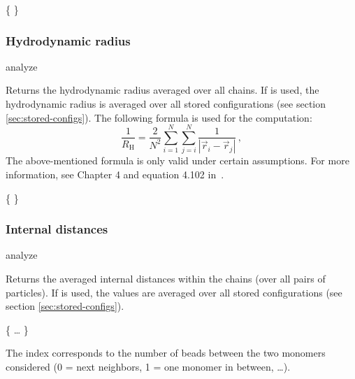 \begin{code}
\{     \}
\end{code}

\subsubsection{Hydrodynamic radius}
\begin{pysyntax}
\end{pysyntax}
\begin{essyntax}
  analyze  
\end{essyntax}
Returns the hydrodynamic radius averaged over all chains.  
If  is used, the hydrodynamic radius is averaged over all stored
configurations (see section \vref{sec:stored-configs}).
The following formula is used for the computation:
\begin{equation}
\label{eq:Rh}
\frac{1}{R_{\mathrm H}} = \frac{2}{N^2} \sum\limits_{i=1}^{N} \sum\limits_{j=i}^{N} \frac{1}{|\vec r_i - \vec r_j|}\,,
\end{equation}
The above-mentioned formula is only valid under certain assumptions.
For more information, see Chapter 4 and equation 4.102 in~\cite{doi86a}.
\begin{code}
\{   \}
\end{code}

\subsubsection{Internal distances}
\begin{essyntax}
 analyze  
\end{essyntax}
Returns the averaged internal distances within the chains (over
all pairs of particles).  
If  is used, the values are averaged over all stored
configurations (see section \vref{sec:stored-configs}).
\begin{code}
\{   \dots {} \}
\end{code}
The index corresponds to the number of beads between the two monomers
considered (0 = next neighbors, 1 = one monomer in between, \dots).

